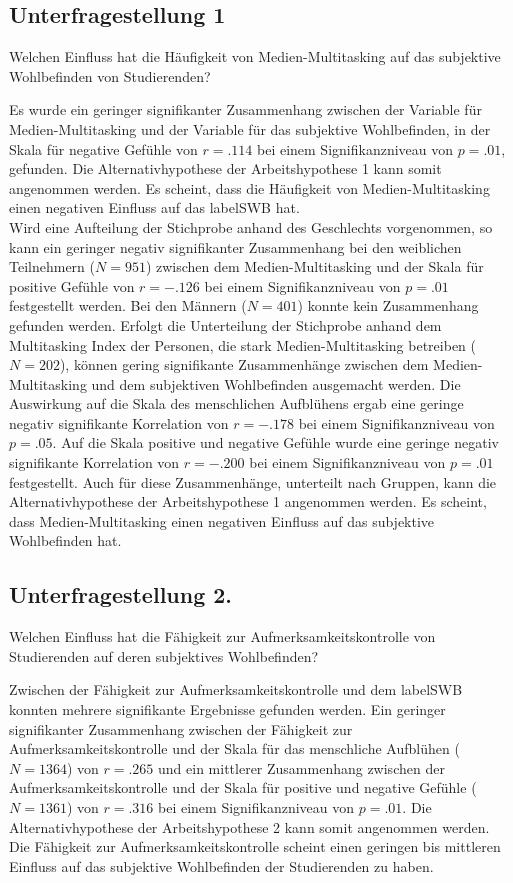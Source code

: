 \subsection{Unterfragestellung 1} Welchen Einfluss hat die Häufigkeit von Medien-Multitasking auf das subjektive Wohlbefinden von Studierenden?
\par
Es wurde ein geringer signifikanter Zusammenhang zwischen der Variable für Medien-Multitasking und der Variable für das subjektive Wohlbefinden, in der Skala für negative Gefühle von $r=.114$ bei einem Signifikanzniveau von $p=.01$, gefunden. Die Alternativhypothese der Arbeitshypothese 1 kann somit angenommen werden. Es scheint, dass die Häufigkeit von Medien-Multitasking einen negativen Einfluss auf das \gls{labelSWB} hat. \\
Wird eine Aufteilung der Stichprobe anhand des Geschlechts vorgenommen, so kann ein geringer negativ signifikanter Zusammenhang bei den weiblichen Teilnehmern ($N=951$) zwischen dem Medien-Multitasking und der Skala für positive Gefühle von $r=-.126$ bei einem Signifikanzniveau von $p=.01$ festgestellt werden. Bei den Männern ($N=401$) konnte kein Zusammenhang gefunden werden. Erfolgt die Unterteilung der Stichprobe anhand dem Multitasking Index der Personen, die stark Medien-Multitasking betreiben ($N=202$), können gering signifikante Zusammenhänge zwischen dem Medien-Multitasking und dem subjektiven Wohlbefinden ausgemacht werden. Die Auswirkung auf die Skala des  menschlichen Aufblühens ergab eine geringe negativ signifikante Korrelation von $r=-.178$ bei einem Signifikanzniveau von $p=.05$. Auf die Skala positive und negative Gefühle wurde eine geringe negativ signifikante Korrelation von $r=-.200$ bei einem Signifikanzniveau von $p=.01$ festgestellt. Auch für diese Zusammenhänge, unterteilt nach Gruppen, kann die Alternativhypothese der Arbeitshypothese 1 angenommen werden. Es scheint, dass Medien-Multitasking einen negativen Einfluss auf das subjektive Wohlbefinden hat.

\subsection{Unterfragestellung 2.} Welchen Einfluss hat die Fähigkeit zur Aufmerksamkeitskontrolle von Studierenden auf deren subjektives Wohlbefinden?

Zwischen der Fähigkeit zur Aufmerksamkeitskontrolle und dem \gls{labelSWB} konnten mehrere signifikante Ergebnisse gefunden werden. Ein geringer signifikanter Zusammenhang zwischen der Fähigkeit zur Aufmerksamkeitskontrolle und der Skala für das menschliche Aufblühen ($N=1364$) von $r=.265$ und ein mittlerer Zusammenhang zwischen der Aufmerksamkeitskontrolle und der Skala für positive und negative Gefühle ($N=1361$) von $r=.316$ bei einem Signifikanzniveau von $p=.01$. Die Alternativhypothese der Arbeitshypothese 2 kann somit angenommen werden. Die Fähigkeit zur Aufmerksamkeitskontrolle scheint einen geringen bis mittleren Einfluss auf das subjektive Wohlbefinden der Studierenden zu haben.

